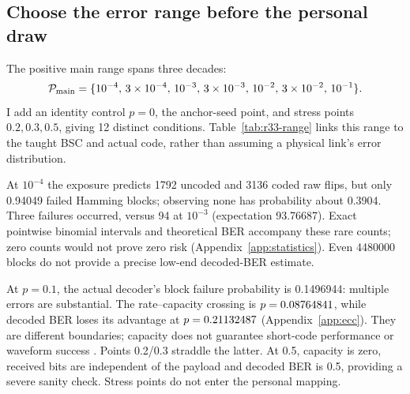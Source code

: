 \FloatBarrier
\subsection{Choose the error range before the personal draw}
\label{sec:r33}
The positive main range spans three decades:
\begin{equation}
 \mathcal P_{\rm main}=
 \{10^{-4},\,3\times10^{-4},\,10^{-3},\,3\times10^{-3},
       \,10^{-2},\,3\times10^{-2},\,10^{-1}\}.
 \label{eq:r33-grid}
\end{equation}
I add an identity control $ p=0 $, the anchor-seed point, and stress
points $0.2,0.3,0.5 $, giving 12 distinct conditions.
Table~\ref{tab:r33-range} links this range to the taught BSC and actual
code, rather than assuming a physical link's error distribution.

\begin{table}[htbp]
 \centering\small
 \caption{Frozen range and stress conditions. Each positive condition exposes 4480000 Hamming blocks; the identity control has 560000. Capacity and finite-code failure are different quantities.}
 \label{tab:r33-range}
 
 
 
\end{table}

At $10^{-4}$ the exposure predicts 1792 uncoded and 3136 coded raw flips,
but only 0.94049 failed Hamming blocks; observing none has probability
about 0.3904. Three failures occurred, versus 94 at $10^{-3}$
(expectation 93.76687). Exact pointwise binomial intervals and theoretical
BER accompany these rare counts; zero counts would not prove zero risk
(Appendix~\ref{app:statistics}). Even 4480000 blocks do not provide
a precise low-end decoded-BER estimate.

At $ p=0.1 $, the actual decoder's block failure probability is 0.1496944:
multiple errors are substantial. The rate--capacity crossing is
$ p=0.08764841 $, while decoded BER loses its advantage at
$ p=0.21132487 $ (Appendix~\ref{app:ecc}). They are different boundaries;
capacity does not guarantee short-code performance or waveform success \citep{shannon1948communication}.
Points 0.2/0.3 straddle the latter. At 0.5, capacity is zero, received bits
are independent of the payload and decoded BER is 0.5, providing a severe
sanity check. Stress points do not enter the personal mapping.

